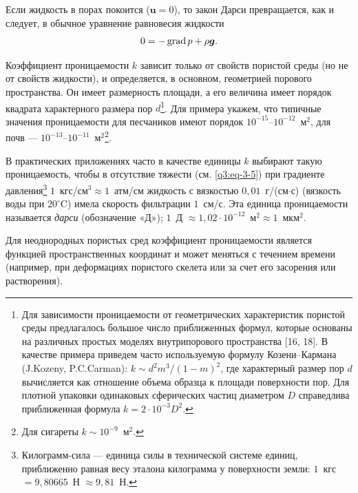 Если жидкость в порах покоится ($\boldsymbol{u}=0$), то закон Дарси превращается, как и следует, в обычное уравнение равновесия жидкости
\[
0=-\operatorname{grad} p+\rho\boldsymbol{g}.
\]

\setcounter{footnote}{0}
Коэффициент проницаемости $k$ зависит только от свойств пористой среды (но не от свойств жидкости), и определяется, в основном, геометрией порового пространства. Он имеет размерность площади, а его величина имеет порядок квадрата характерного размера пор $d$\footnote{Для зависимости проницаемости от геометрических характеристик пористой среды предлагалось большое число приближенных формул, которые основаны на различных простых моделях внутрипорового пространства [16, 18]. В качестве примера приведем часто используемую формулу Козени--Кармана (J.Kozeny, P.C.Carman): $k\sim d^2m^3/(1-m)^2$, где характерный размер пор $d$ вычисляется как отношение объема образца к площади поверхности пор. Для плотной упаковки одинаковых сферических частиц диаметром $D$ справедлива приближенная формула $k=2\cdot10^{-3}D^2$.}. Для примера укажем, что типичные значения проницаемости для песчаников имеют порядок $10^{-15}$--$10^{-12}$~м$^2$, для почв --- $10^{-13}$--$10^{-11}$~м$^2$\footnote{Для сигареты $k\sim10^{-9}$~м$^2$.}.

В практических приложениях часто в качестве единицы $k$ выбирают такую проницаемость, чтобы в отсутствие тяжести (см. \eqref{q3:eq-3-5}) при градиенте давления\footnote{Килограмм-сила --- единица силы в технической системе единиц, приближенно равная весу эталона килограмма у поверхности земли: $1$~кгс $=9{,}80665$~Н $\approx9{,}81$~Н.} $1$~кгс/см$^3\approx1$~атм/см жидкость с вязкостью $0{,}01$~г/(см$\cdot$с) (вязкость воды при $20^\circ$C) имела скорость фильтрации $1$~см/с. Эта единица проницаемости называется \textit{дарси} (обозначение «Д»); $1$~Д $\approx1{,}02\cdot10^{-12}$~м$^2\approx1$~мкм$^2$.

Для неоднородных пористых сред коэффициент проницаемости является функцией пространственных координат и может меняться с течением времени (например, при деформациях пористого скелета или за счет его засорения или растворения).

